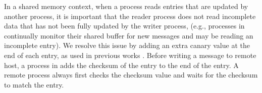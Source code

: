 In a shared memory context, when a process reads entries that are
updated by another process, it is important that the reader process does not
read incomplete data that has not been fully updated by the writer process,
(e.g., processes in \libname continually monitor their shared buffer for new
messages and may be reading an incomplete entry). We resolve this issue by
adding an extra canary value at the end of each entry, as used in previous works 
\cite{APUS,FaRM,kalia2014using, islam2012high, Mu}. 
Before writing a message to remote host, a process in \libname adds the checksum of the
entry to the end of the entry. A remote process always first checks
the checksum value and waits for the checksum to match the entry.


%
%
